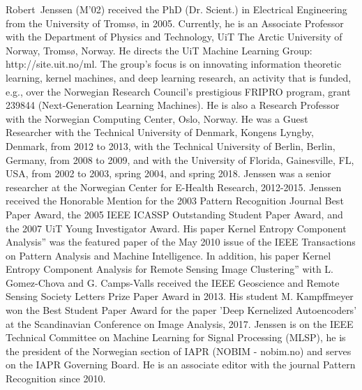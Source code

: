\documentclass[journal]{IEEEtran}
\begin{document}
\begin{IEEEbiography}{Robert~Jenssen}
(M’02) received the PhD (Dr. Scient.) in Electrical Engineering from the University of Troms{\o}, in 2005.
Currently, he is an Associate Professor with the Department of Physics and Technology, UiT The Arctic University of Norway, Troms{\o}, Norway. He directs the UiT Machine Learning Group: http://site.uit.no/ml. The group's focus is on innovating information theoretic learning, kernel machines, and deep learning research, an activity that is funded, e.g., over the Norwegian Research Council's prestigious FRIPRO program, grant 239844 (Next-Generation Learning Machines). He is also a Research Professor with the Norwegian Computing Center, Oslo, Norway. He was a Guest Researcher with the Technical University of Denmark, Kongens Lyngby, Denmark, from 2012 to 2013, with the Technical University of Berlin, Berlin, Germany, from 2008 to 2009, and with the University of Florida, Gainesville, FL, USA, from 2002 to 2003, spring 2004, and spring 2018. Jenssen was a senior researcher at the Norwegian Center for E-Health Research, 2012-2015. Jenssen received the Honorable Mention for the 2003 Pattern Recognition Journal Best Paper Award, the 2005 IEEE ICASSP Outstanding Student Paper Award, and the 2007 UiT Young Investigator Award. His paper Kernel Entropy Component Analysis” was the featured paper of the May 2010 issue of the IEEE Transactions on Pattern Analysis and Machine Intelligence. In addition, his paper Kernel Entropy Component Analysis for Remote Sensing Image Clustering” with L. Gomez-Chova and G. Camps-Valls received the IEEE Geoscience and Remote Sensing Society Letters Prize Paper Award in 2013. His student M. Kampffmeyer won the Best Student Paper Award for the paper 'Deep Kernelized Autoencoders' at the Scandinavian Conference on Image Analysis, 2017. Jenssen is on the IEEE Technical Committee on Machine Learning for Signal Processing (MLSP), he is the president of the Norwegian section of IAPR (NOBIM - nobim.no) and serves on the IAPR Governing Board. He is an associate editor with the journal Pattern Recognition since 2010.
\end{IEEEbiography}
\end{document}
